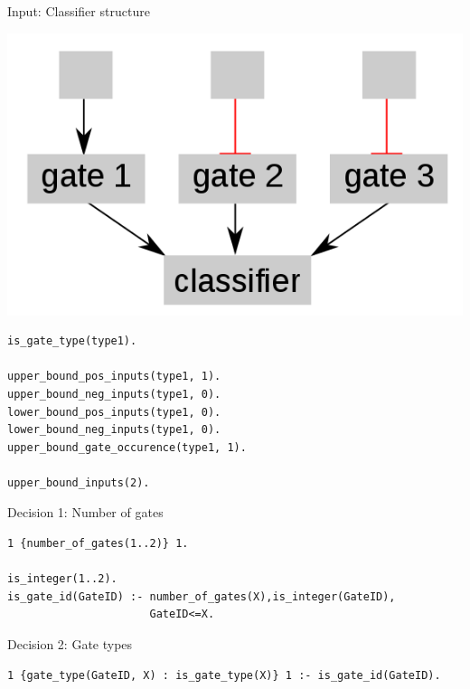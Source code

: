 \documentclass[10pt,dvipsnames]{beamer}
\begin{document}
\begin{frame}[fragile]{Input: Classifier structure}
\begin{center}
\includegraphics[scale=0.25]{classifier.png}
\end{center}
\vspace{0.3cm}

\begin{verbatim}
is_gate_type(type1).

upper_bound_pos_inputs(type1, 1). 
upper_bound_neg_inputs(type1, 0). 
lower_bound_pos_inputs(type1, 0). 
lower_bound_neg_inputs(type1, 0). 
upper_bound_gate_occurence(type1, 1). 
 
upper_bound_inputs(2).
\end{verbatim}

\end{frame}


\begin{frame}[fragile]{Decision 1: Number of gates}
\small
\begin{verbatim}
1 {number_of_gates(1..2)} 1.

is_integer(1..2).
is_gate_id(GateID) :- number_of_gates(X),is_integer(GateID), 
                      GateID<=X.
\end{verbatim}
\end{frame}


\begin{frame}[fragile]{Decision 2: Gate types}
\small
\begin{verbatim}
1 {gate_type(GateID, X) : is_gate_type(X)} 1 :- is_gate_id(GateID).
\end{verbatim}
\end{frame}
\end{document}
